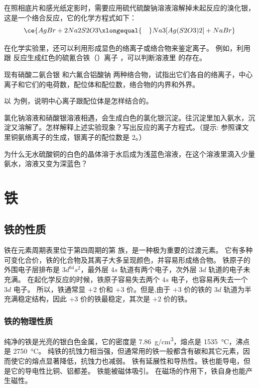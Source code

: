在照相底片和感光纸定影时，需要应用硫代硫酸钠溶液溶解掉未起反应的溴化银，这是一个络合反应，它的化学方程式如下：
\[ \ce{AgBr + 2Na2S2O3 \xlongequal{\quad} Na3[Ag(S2O3)2] + NaBr} \]

在化学实验里，还可以利用形成显色的络离子或络合物来鉴定离子。
例如，利用  跟  反应生成红色的硫氰合铁（）离子 ，可以判断溶液里  的存在。

\begin{Practice}[习题]
\begin{question}
  \item 现有硝酸二氨合银  和六氟合铝酸钠  两种络合物，试指出它们各自的络离子，中心离子和它们的电荷数，配位体和配位数，络合物的内界和外界。
  \item 以 \ce{[Ag(NH3)2]+} 为例，说明中心离子跟配位体是怎样结合的。
  \item 氯化钠溶液和硝酸银溶液相遇，会生成白色的氯化银沉淀。往沉淀里加入氨水，沉淀又溶解了。怎样解释上述实验现象？写出反应的离子方程式。（提示: 参照课文里铜氨络离子的生成，银离子的配位数是 2。）
  \item 为什么无水硫酸铜的白色的晶体溶于水后成为浅蓝色溶液，在这个溶液里滴入少量氨水，溶液又变为深蓝色？
\end{question}
\end{Practice}


\section{铁}
\subsection{铁的性质}
铁在元素周期表里位于第四周期的第  族，是一种极为重要的过渡元素。
它有多种可变化合价，铁的化合物及其离子大多呈现颜色，并容易形成络合物。
铁原子的外围电子层排布是 $3d^64s^2$，最外层 $4s$ 轨道有两个电子，次外层 $3d$ 轨道的电子未充满。
在起化学反应的时候，铁原子容易失去两个 $4s$ 电子，也容易再失去一个 $3d$ 电子。
所以，铁通常显 $+2$ 价和 $+3$ 价。但是,由于 $+3$ 价的铁的 $3d$ 轨道为半充满稳定结构，因此 $+3$ 价的铁最稳定，其次是 $+2$ 价的铁。

\subsubsection{铁的物理性质}
纯净的铁是光亮的银白色金属，它的密度是 \qty{7.86}{g/cm^3}，熔点是 \qty{1535}{\celsius}，沸点是 \qty{2750}{\celsius}。
纯铁的抗蚀力相当强，但通常用的铁一般都含有碳和其它元素，因而使它的熔点显著降低，抗蚀力也减弱。
铁有延展性和导热性。铁也能导电，但是它的导电性比铜、铝都差。
铁能被磁体吸引。
在磁场的作用下，铁自身也能产生磁性。

